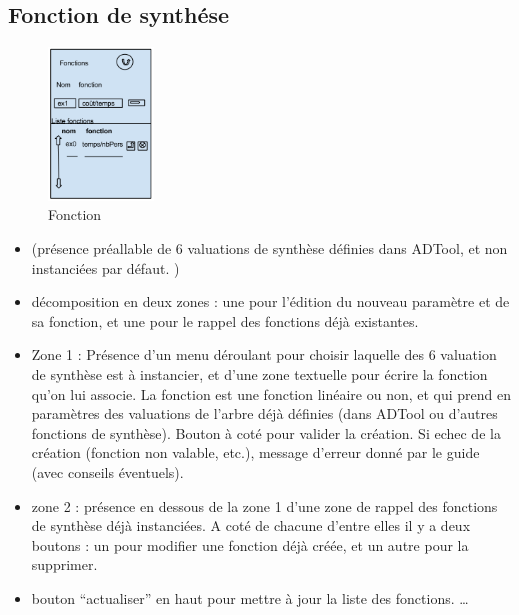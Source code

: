 	\subsection{Fonction de synthése}
		\begin{figure}
			\begin{center}
				\includegraphics[width=0.25\textwidth]{figure/fonction.png}
			\end{center}
			\caption{Fonction}
			\label{fig:fonction}
		\end{figure}

		\begin{itemize}
			\item (présence préallable de 6 valuations de synthèse définies dans ADTool, et non instanciées par défaut. )
			\item décomposition en deux zones : une pour l'édition du nouveau paramètre et de sa fonction, et une pour le rappel des fonctions déjà existantes.
			\item Zone 1 : Présence d’un menu déroulant pour choisir laquelle des 6 valuation de synthèse est à instancier, et d'une zone textuelle pour écrire la fonction qu'on lui associe. La fonction est une fonction linéaire ou non, et qui prend en paramètres des valuations de l'arbre déjà définies (dans ADTool ou d'autres fonctions de synthèse). Bouton à coté pour valider la création. Si echec de la création (fonction non valable, etc.), message d'erreur donné par le guide (avec conseils éventuels).
			\item zone 2 : présence en dessous de la zone 1 d’une zone de rappel des fonctions de synthèse déjà instanciées. A coté de chacune d’entre elles il y a deux boutons : un pour modifier une fonction déjà créée, et un autre pour la supprimer.
			\item bouton “actualiser” en haut pour mettre à jour la liste des fonctions. \ldots
		\end{itemize}
		
		
		

